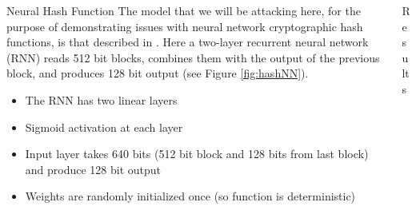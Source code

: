 \documentclass[final]{beamer}
\newlength{\onecolwid}
\newlength{\twocolwid}
\begin{document}
\begin{frame}[t]
\begin{columns}[t]
\begin{column}{\twocolwid}
\begin{columns}[t,totalwidth=\twocolwid] %

\begin{column}{\onecolwid}\vspace{-.6in} %


\begin{block}{Neural Hash Function}
The model that we will be attacking here, for the purpose of demonstrating
issues with neural network cryptographic hash functions, is that described
in \cite{hash1}.  Here a two-layer recurrent neural network (RNN)
reads 512 bit blocks, combines them with the output of the previous block,
and produces 128 bit output (see Figure \ref{fig:hashNN}).

\begin{itemize}
    \item The RNN has two linear layers
    \item Sigmoid activation at each layer
    \item Input layer takes 640 bits (512 bit block and 128 bits from last 
        block) and produce 128 bit output
    \item Weights are randomly initialized once (so function is deterministic)
\end{itemize}

\end{block}


\end{column} %

\begin{column}{\onecolwid}\vspace{-.6in} %


\begin{block}{Results}


\end{block}
\end{column}
\end{columns}
\end{column}
\end{columns}
\end{frame}
\end{document}
